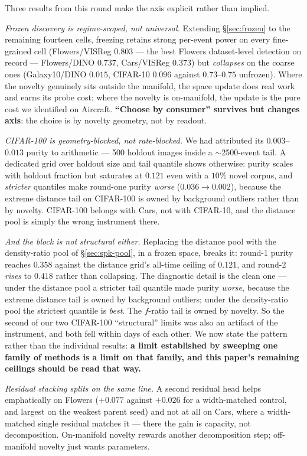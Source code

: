 \documentclass{article}
\begin{document}
Three results from this round make the axis explicit rather than implied.

\emph{Frozen discovery is regime-scoped, not universal.} Extending
\S\ref{sec:frozen} to the remaining fourteen cells, freezing retains strong
per-event power on every fine-grained cell (Flowers/VISReg $0.803$ --- the best
Flowers dataset-level detection on record --- Flowers/DINO $0.737$, Cars/VISReg
$0.373$) but \emph{collapses} on the coarse ones (Galaxy10/DINO $0.015$,
CIFAR-10 $0.096$ against $0.73$--$0.75$ unfrozen). Where the novelty genuinely
sits outside the manifold, the space update does real work and earns its probe
cost; where the novelty is on-manifold, the update is the pure cost we
identified on Aircraft. \textbf{``Choose by consumer'' survives but changes
axis}: the choice is by novelty geometry, not by readout.

\emph{CIFAR-100 is geometry-blocked, not rate-blocked.} We had attributed its
$0.003$--$0.013$ purity to arithmetic --- 500 holdout images inside a
$\sim$2500-event tail. A dedicated grid over holdout size and tail quantile
shows otherwise: purity scales with holdout fraction but saturates at $0.121$
even with a $10\%$ novel corpus, and \emph{stricter} quantiles make round-one
purity \emph{worse} ($0.036\to0.002$), because the extreme distance tail on
CIFAR-100 is owned by background outliers rather than by novelty. CIFAR-100
belongs with Cars, not with CIFAR-10, and the distance pool is simply the wrong
instrument there.

\emph{And the block is not structural either.} Replacing the distance pool with
the density-ratio pool of \S\ref{sec:spk-pool}, in a frozen space, breaks it:
round-1 purity reaches $0.358$ against the distance grid's all-time ceiling of
$0.121$, and round-2 \emph{rises} to $0.418$ rather than collapsing. The
diagnostic detail is the clean one --- under the distance pool a stricter tail
quantile made purity \emph{worse}, because the extreme distance tail is owned
by background outliers; under the density-ratio pool the strictest quantile is
\emph{best}. The $f$-ratio tail is owned by novelty. So the second of our two
CIFAR-100 ``structural'' limits was also an artifact of the instrument, and both
fell within days of each other. We now state the pattern rather than the
individual results: \textbf{a limit established by sweeping one family of
methods is a limit on that family, and this paper's remaining ceilings should
be read that way.}

\emph{Residual stacking splits on the same line.} A second residual head helps
emphatically on Flowers ($+0.077$ against $+0.026$ for a width-matched control,
and largest on the weakest parent seed) and not at all on Cars, where a
width-matched single residual matches it --- there the gain is capacity, not
decomposition. On-manifold novelty rewards another decomposition step;
off-manifold novelty just wants parameters.
\end{document}
